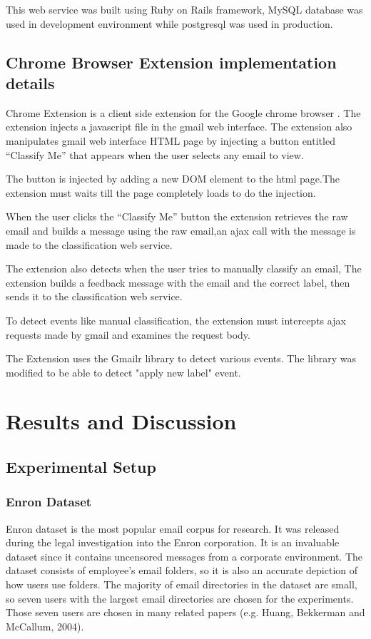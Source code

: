     This web service was built using Ruby on Rails \cite{ROR} framework, MySQL database was used
    in development environment while postgresql was used in production.


\subsection{Chrome Browser Extension implementation details}
    Chrome Extension is a client side extension for the Google chrome browser \cite{CHROME}.
    The extension injects a javascript file in the gmail web interface. The extension also manipulates
    gmail web interface HTML page by injecting a button entitled ``Classify Me''
    that appears when the user selects any email to view.

    The button is injected by adding a new DOM element to the html page.The extension must waits till
    the page completely loads to do the injection.

    When the user clicks the ``Classify Me'' button the extension retrieves the raw email and
    builds a message using the raw email,an ajax call with the message is made to the 
    classification web service.

    The extension also detects when the user tries to manually classify an email, The extension builds
    a feedback message with the email and the correct label, then sends it to the classification 
    web service.

    To detect events like manual classification, the extension must intercepts ajax requests made by
    gmail and examines the request body.

    The Extension uses the Gmailr library \cite{GMAILR} to detect various events. The library was modified 
    to be able to detect "apply new label" event.

\section{Results and Discussion}
\label{sec:6_results_discussion}
\subsection{Experimental Setup}

\subsubsection{Enron Dataset \cite{ENRON}}
Enron dataset is the most popular email corpus for research. It was released 
during the legal investigation into the Enron corporation.
It is an invaluable dataset since it contains uncensored messages from a 
corporate environment. The dataset consists of employee's email folders, 
so it is also an accurate depiction of how users use folders. The majority 
of email directories in the dataset are small, so seven users with the largest 
email directories are chosen for the experiments. Those seven users are chosen 
in many related papers (e.g. Huang, Bekkerman and McCallum, 2004\cite{RON04}).

